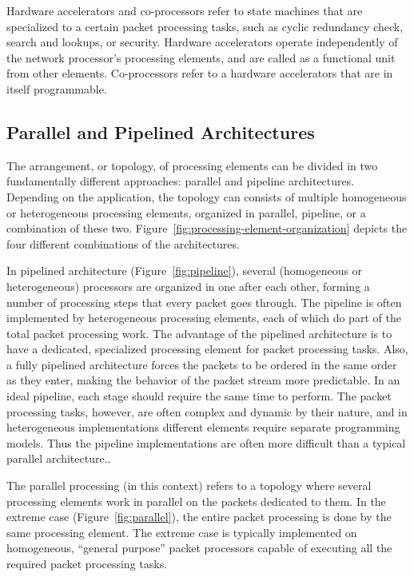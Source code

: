Hardware accelerators and co-processors refer to state machines that are specialized to a certain packet processing tasks, such as cyclic redundancy check, search and lookups, or security. Hardware accelerators operate independently of the network processor's processing elements, and are called as a functional unit from other elements. Co-processors refer to a hardware accelerators that are in itself programmable.~\cite{Giladi:2008:Network}

\subsection{Parallel and Pipelined Architectures}
The arrangement, or topology, of processing elements can be divided in two fundamentally different approaches: parallel and pipeline architectures. Depending on the application, the topology can consists of multiple homogeneous or heterogeneous processing elements, organized in parallel, pipeline, or a combination of these two. Figure~\ref{fig:processing-element-organization} depicts the four different combinations of the architectures.~\cite{Giladi:2008:Network}

In pipelined architecture (Figure~\ref{fig:pipeline}), several (homogeneous or heterogeneous) processors are organized in one after each other, forming a number of processing steps that every packet goes through. The pipeline is often implemented by heterogeneous processing elements, each of which do part of the total packet processing work. The advantage of the pipelined architecture is to have a dedicated, specialized processing element for packet processing tasks. Also, a fully pipelined architecture forces the packets to be ordered in the same order as they enter, making the behavior of the packet stream more predictable. In an ideal pipeline, each stage should require the same time to perform. The packet processing tasks, however, are often complex and dynamic by their nature, and in heterogeneous implementations different elements require separate programming models. Thus the pipeline implementations are often more difficult than a typical parallel architecture..~\cite{Giladi:2008:Network}

The parallel processing (in this context) refers to a topology where several processing elements work in parallel on the packets dedicated to them. In the extreme case (Figure~\ref{fig:parallel}), the entire packet processing is done by the same processing element. The extreme case is typically implemented on homogeneous, ``general purpose'' packet processors capable of executing all the required packet processing tasks.~\cite{Giladi:2008:Network}

